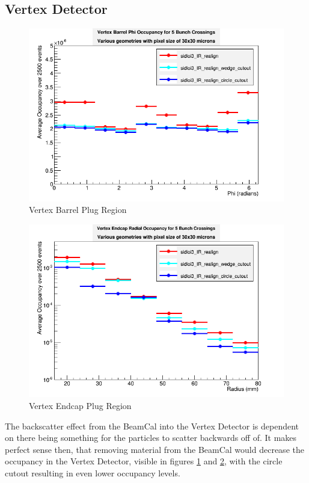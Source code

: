 \documentclass{report}
\begin{document}
            \subsection{Vertex Detector} 
                \begin{figure}[H] 
                    \includegraphics[width=\textwidth]{VradOccupancy_plug_brl}
                    \centering
                    \caption{Vertex Barrel Plug Region}
                    \label{fig:plug_vertex_brl}
                \end{figure}
                \begin{figure}[H] 
                    \includegraphics[width=\textwidth]{VradOccupancy_plug_ecp}
                    \centering
                    \caption{Vertex Endcap Plug Region}
                    \label{fig:plug_vertex_ecp}
                \end{figure}
                The backscatter effect from the BeamCal into the Vertex Detector is dependent on there being something for the particles to scatter backwards off of. It makes perfect sense then, that removing material from the BeamCal would decrease the occupancy in the Vertex Detector, visible in figures \ref{fig:plug_vertex_brl} and \ref{fig:plug_vertex_ecp}, with the circle cutout resulting in even lower occupancy levels.
                
\end{document}
